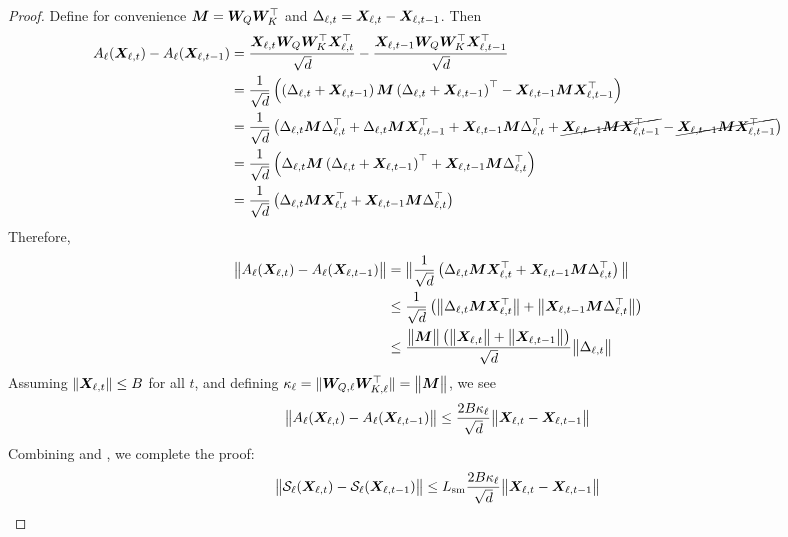 \begin{proof}
    Define for convenience ${\bm{M}} = {\bm{W}}_Q {\bm{W}}_K^{\top}$ and $\Delta_{\ell, t} = {\bm{X}}_{\ell,t}- {\bm{X}}_{\ell,t-1}$. Then
    \begin{align*}
        A_\ell({\bm{X}}_{\ell,t})- A_\ell({\bm{X}}_{\ell,t-1}) &= \frac{{\bm{X}}_{\ell,t} {\bm{W}}_Q {\bm{W}}_K^{\top} {\bm{X}}^{\top}_{\ell,t}}{\sqrt{d}} - \frac{{\bm{X}}_{\ell,t-1} {\bm{W}}_Q {\bm{W}}_K^{\top} {\bm{X}}^{\top}_{\ell,t-1}}{\sqrt{d}} \\
        &= \frac{1}{\sqrt{d}} \left ( \left ( \Delta_{\ell, t} + {\bm{X}}_{\ell, t-1} \right ) {\bm{M}} \left ( \Delta_{\ell, t} + {\bm{X}}_{\ell, t-1} \right )^{\top} - {\bm{X}}_{\ell,t-1} {\bm{M}} {\bm{X}}^{\top}_{\ell,t-1} \right ) \\
        &= \frac{1}{\sqrt{d}} \left (  {\Delta_{\ell, t} {\bm{M}} \Delta_{\ell, t}^{\top}} + \Delta_{\ell, t} {\bm{M}} {\bm{X}}_{\ell, t-1}^{\top} +  {\bm{X}}_{\ell, t-1} {\bm{M}} \Delta_{\ell, t}^{\top} + \cancel{{\bm{X}}_{\ell, t-1} {\bm{M}} {\bm{X}}_{\ell, t-1}^{\top}} - \cancel{{\bm{X}}_{\ell,t-1} {\bm{M}} {\bm{X}}^{\top}_{\ell,t-1}} \right )  \\
        &= \frac{1}{\sqrt{d}} \left (  \Delta_{\ell, t} {\bm{M}} \left ( \Delta_{\ell, t} + {\bm{X}}_{\ell, t-1} \right )^{\top} +  {\bm{X}}_{\ell, t-1} {\bm{M}} \Delta_{\ell, t}^{\top} \right ) \\
        &= \frac{1}{\sqrt{d}} \left (  \Delta_{\ell, t} {\bm{M}} {\bm{X}}_{\ell, t}^{\top} +  {\bm{X}}_{\ell, t-1} {\bm{M}} \Delta_{\ell, t}^{\top} \right ) \\
    \end{align*}
    Therefore,
    \begin{align*}
        \big\|A_\ell({\bm{X}}_{\ell,t})- A_\ell({\bm{X}}_{\ell,t-1})\big\| &= \big\| \frac{1}{\sqrt{d}} \left (  \Delta_{\ell, t} {\bm{M}} {\bm{X}}_{\ell, t}^{\top} +  {\bm{X}}_{\ell, t-1} {\bm{M}} \Delta_{\ell, t}^{\top} \right ) \big\| \\
        &\leq \frac{1}{\sqrt{d}} \left ( \big\| \Delta_{\ell, t} {\bm{M}} {\bm{X}}_{\ell, t}^{\top} \big\| + \big\| {\bm{X}}_{\ell, t-1} {\bm{M}} \Delta_{\ell, t}^{\top} \big\| \right ) \\
        &\leq \frac{\big\| {\bm{M}} \big\| \left ( \big\| {\bm{X}}_{\ell, t} \big\| + \big\| {\bm{X}}_{\ell, t-1} \big\| \right )}{\sqrt{d}} \big\| \Delta_{\ell, t} \big\|
    \end{align*}
    Assuming $\|{\bm{X}}_{\ell,t}\|\le B$ for all $t$, and defining $\kappa_\ell = \|{\bm{W}}_{Q,\ell}{\bm{W}}_{K,\ell}^\top\| = \big\| {\bm{M}} \big\|$, we see
    \begin{equation}\label{eq:a_inequality}
        \big\|A_\ell({\bm{X}}_{\ell,t})- A_\ell({\bm{X}}_{\ell,t-1})\big\| \leq \frac{2 B \kappa_\ell}{\sqrt{d}} \big\|{\bm{X}}_{\ell,t}-{\bm{X}}_{\ell,t-1}\big\|
    \end{equation}
    Combining  and , we complete the proof:
    \begin{equation}
        \big\|\mathcal S_\ell({\bm{X}}_{\ell,t})-\mathcal S_\ell({\bm{X}}_{\ell,t-1})\big\| \leq L_{\mathrm{sm}} \frac{2 B \kappa_\ell}{\sqrt{d}} \big\|{\bm{X}}_{\ell,t}-{\bm{X}}_{\ell,t-1}\big\|
    \end{equation}
\end{proof}